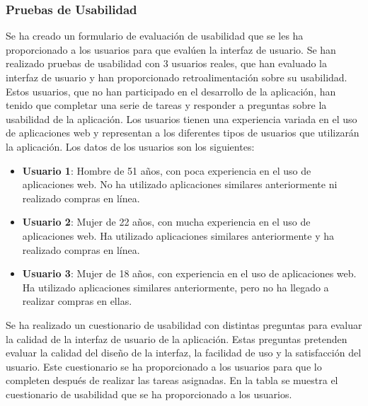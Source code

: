 \subsubsection{Pruebas de Usabilidad}
Se ha creado un formulario de evaluación de usabilidad que se les ha proporcionado a los usuarios para que evalúen la interfaz de usuario.
Se han realizado pruebas de usabilidad con 3 usuarios reales, que han evaluado la interfaz de usuario y han proporcionado retroalimentación sobre su usabilidad.
Estos usuarios, que no han participado en el desarrollo de la aplicación, han tenido que completar una serie de tareas y responder a preguntas sobre la usabilidad de la aplicación.
Los usuarios tienen una experiencia variada en el uso de aplicaciones web y representan a los diferentes tipos de usuarios que utilizarán la aplicación.
Los datos de los usuarios son los siguientes:
\begin{itemize}
    \item \textbf{Usuario 1}: Hombre de 51 años, con poca experiencia en el uso de aplicaciones web. No ha utilizado aplicaciones similares anteriormente ni realizado compras en línea.
    \item \textbf{Usuario 2}: Mujer de 22 años, con mucha experiencia en el uso de aplicaciones web. Ha utilizado aplicaciones similares anteriormente y ha realizado compras en línea.
    \item \textbf{Usuario 3}: Mujer de 18 años, con experiencia en el uso de aplicaciones web. Ha utilizado aplicaciones similares anteriormente, pero no ha llegado a realizar compras en ellas.
\end{itemize}

Se ha realizado un cuestionario de usabilidad con distintas preguntas para evaluar la calidad de la interfaz de usuario de la aplicación.
Estas preguntas pretenden evaluar la calidad del diseño de la interfaz, la facilidad de uso y la satisfacción del usuario.
Este cuestionario se ha proporcionado a los usuarios para que lo completen después de realizar las tareas asignadas.
En la tabla   se muestra el cuestionario de usabilidad que se ha proporcionado a los usuarios.


